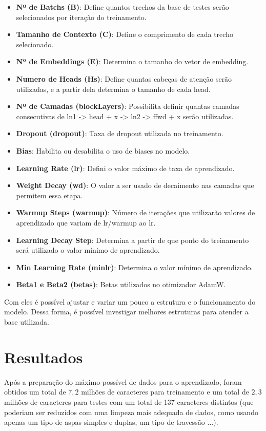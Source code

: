 \documentclass[9pt,technote]{IEEEtran}
\begin{document}
\begin{itemize}
    \item \textbf{Nº de Batchs (B)}: Define quantos trechos da base de testes serão selecionados por iteração do treinamento.
    \item \textbf{Tamanho de Contexto (C)}: Define o comprimento de cada trecho selecionado.
    \item \textbf{Nº de Embeddings (E)}: Determina o tamanho do vetor de embedding.
    \item \textbf{Numero de Heads (Hs)}: Define quantas cabeças de atenção serão utilizadas, e a partir dela determina o tamanho de cada head.
    \item \textbf{Nº de Camadas (blockLayers)}: Possibilita definir quantas camadas consecutivas de ln1 -> head + x -> ln2 -> ffwd + x serão utilizadas.
    \item \textbf{Dropout (dropout)}: Taxa de dropout utilizada no treinamento.
    \item \textbf{Bias}: Habilita ou desabilita o uso de biases no modelo.
    \item \textbf{Learning Rate (lr)}: Defini o valor máximo de taxa de aprendizado.
    \item \textbf{Weight Decay (wd)}: O valor a ser usado de decaimento nas camadas que permitem essa etapa.
    \item \textbf{Warmup Steps (warmup)}: Número de iterações que utilizarão valores de aprendizado que variam de lr/warmup ao lr.
    \item \textbf{Learning Decay Step}: Determina a partir de que ponto do treinamento será utilizado o valor mínimo de aprendizado.
    \item \textbf{Min Learning Rate (minlr)}: Determina o valor mínimo de aprendizado.
    \item \textbf{Beta1 e Beta2 (betas)}: Betas utilizados no otimizador AdamW.
\end{itemize}

Com eles é possível ajustar e variar um pouco a estrutura e o funcionamento do modelo. Dessa forma, é possível investigar melhores estruturas para atender a base utilizada.

\section{Resultados}

Após a preparação do máximo possível de dados para o aprendizado, foram obtidos um total de $7,2$ milhões de caracteres para treinamento e um total de $2,3$ milhões de caracteres para testes com um total de 137 caracteres distintos (que poderiam ser reduzidos com uma limpeza mais adequada de dados, como usando apenas um tipo de aspas simples e duplas, um tipo de travessão ...).
\end{document}
